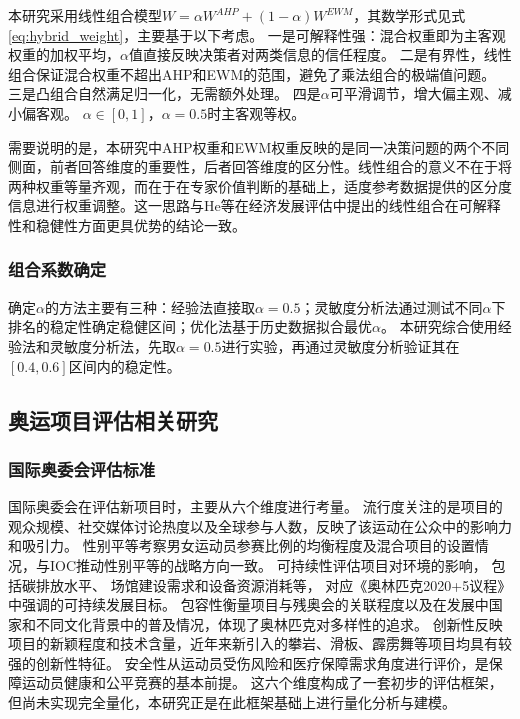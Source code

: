 \documentclass[twoside]{CUGThesis}
\begin{document}
本研究采用线性组合模型$W = \alpha W^{AHP} + (1-\alpha)W^{EWM}$，其数学形式见式\eqref{eq:hybrid_weight}，主要基于以下考虑。
一是可解释性强：混合权重即为主客观权重的加权平均，$\alpha$值直接反映决策者对两类信息的信任程度。
二是有界性，线性组合保证混合权重不超出AHP和EWM的范围，避免了乘法组合的极端值问题\cite{Zhang2023,Liang2023}。
三是凸组合自然满足归一化，无需额外处理。
四是$\alpha$可平滑调节，增大偏主观、减小偏客观。
$\alpha \in [0,1]$，$\alpha = 0.5$时主客观等权。

需要说明的是，本研究中AHP权重和EWM权重反映的是同一决策问题的两个不同侧面，前者回答维度的重要性，后者回答维度的区分性。线性组合的意义不在于将两种权重等量齐观，而在于在专家价值判断的基础上，适度参考数据提供的区分度信息进行权重调整。这一思路与He等\cite{He2025}在经济发展评估中提出的线性组合在可解释性和稳健性方面更具优势的结论一致。

\subsubsection{组合系数确定}

确定$\alpha$的方法主要有三种：经验法直接取$\alpha = 0.5$；灵敏度分析法通过测试不同$\alpha$下排名的稳定性确定稳健区间；优化法基于历史数据拟合最优$\alpha$。
本研究综合使用经验法和灵敏度分析法，先取$\alpha = 0.5$进行实验，再通过灵敏度分析验证其在$[0.4,0.6]$区间内的稳定性\cite{Zhang2023,Liang2023}。

\subsection{奥运项目评估相关研究}

\subsubsection{国际奥委会评估标准}

国际奥委会在评估新项目时，主要从六个维度进行考量\cite{Li2013}。
流行度关注的是项目的观众规模、社交媒体讨论热度以及全球参与人数，反映了该运动在公众中的影响力和吸引力。
性别平等考察男女运动员参赛比例的均衡程度及混合项目的设置情况，与IOC推动性别平等的战略方向一致。
可持续性评估项目对环境的影响，
包括碳排放水平、
场馆建设需求和设备资源消耗等，
对应《奥林匹克2020+5议程》中强调的可持续发展目标。
包容性衡量项目与残奥会的关联程度以及在发展中国家和不同文化背景中的普及情况，体现了奥林匹克对多样性的追求。
创新性反映项目的新颖程度和技术含量，近年来新引入的攀岩、滑板、霹雳舞等项目均具有较强的创新性特征。
安全性从运动员受伤风险和医疗保障需求角度进行评价，是保障运动员健康和公平竞赛的基本前提。
这六个维度构成了一套初步的评估框架，但尚未实现完全量化，本研究正是在此框架基础上进行量化分析与建模。
\end{document}
